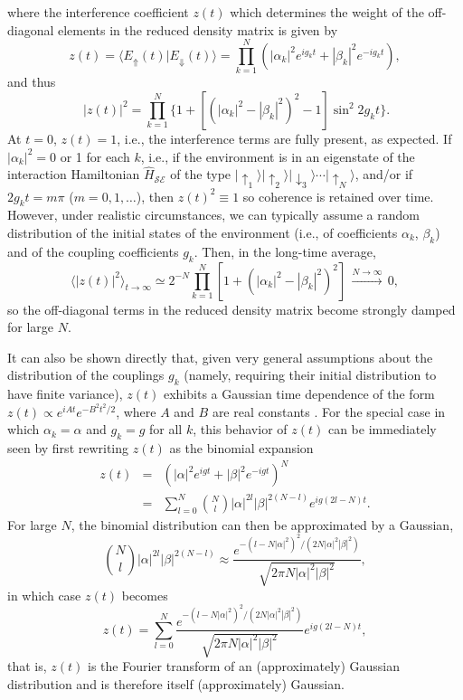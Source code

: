\documentclass[rmp,aps,amsmath,amsfonts,noshowkeys,noshowpacs,12pt]{revtex4}
\newcommand{\ket}[1]{\ensuremath{|{#1\rangle}}}
\begin{document}
%
where the interference coefficient $z(t)$ which determines the weight
of the off-diagonal elements in the reduced density matrix is given by
%
\begin{equation} 
z(t) = \langle E_{\Uparrow}(t) | E_{\Downarrow}(t) \rangle 
=\prod_{k=1}^N (|\alpha_k|^2 e^{ig_kt} + |\beta_k|^2 e^{-ig_kt} ),
\end{equation} 
%
and thus
%
\begin{equation} \
|z(t)|^2 = \prod_{k=1}^N \{ 1 + [(|\alpha_k|^2 - |\beta_k|^2)^2
-1] \sin^2 2g_kt \}. 
\end{equation} 
%
At $t=0$, $z(t)=1$, i.e., the interference terms are fully present, as
expected. If $|\alpha_k|^2=0$ or 1 for each $k$, i.e., if the
environment is in an eigenstate of the interaction Hamiltonian
$\widehat{H}_\mathcal{SE}$ of the type $\ket{\uparrow_1} \ket{\uparrow_2}
\ket{\downarrow_3} \cdots \ket{\uparrow_N}$, and/or if $2g_kt = m\pi$
($m=0,1,\hdots$), then $z(t)^2 \equiv 1$ so coherence is retained over
time.  However, under realistic circumstances, we can typically assume
a random distribution of the initial states of the environment (i.e., of
coefficients $\alpha_k$, $\beta_k$) and of the coupling coefficients
$g_k$. Then, in the long-time average, 
%
\begin{equation}
\langle |z(t)|^2 \rangle_{t \rightarrow \infty} 
\simeq 2^{-N} \prod_{k=1}^N [1 + (|\alpha_k|^2 -
|\beta_k|^2)^2] \, \stackrel{N\rightarrow \infty}{\longrightarrow} \, 0,
\end{equation} 
%
so the off-diagonal terms in the reduced density matrix become
strongly damped for large $N$. 

It can also be shown directly that, given very general assumptions
about the distribution of the couplings $g_k$ (namely, requiring their
initial distribution to have finite variance), $z(t)$ exhibits a
Gaussian time dependence of the form $z(t) \propto e^{iAt}
e^{-B^2t^2/2}$, where $A$ and $B$ are real constants
\citep{Zurek:2003:om}. For the special case in which $\alpha_k=\alpha$
and $g_k=g$ for all $k$, this behavior of $z(t)$ can be immediately
seen by first rewriting $z(t)$ as the binomial expansion
%
\begin{eqnarray} 
z(t) &=& (|\alpha|^2 e^{igt} + |\beta|^2 e^{-igt} )^N \nonumber \\ &=& \sum_{l=0}^N
\binom{N}{l} |\alpha|^{2l} |\beta|^{2(N-l)} e^{ig(2l-N)t}.
\end{eqnarray} 
%
For large $N$, the binomial distribution can then be approximated by a
Gaussian,
%
\begin{equation}
\binom{N}{l} |\alpha|^{2l} |\beta|^{2(N-l)} \approx
\frac{e^{-(l-N|\alpha|^2)^2/(2N|\alpha|^2 |\beta|^2)}}{\sqrt{2\pi N |\alpha|^2 |\beta|^2}},
\end{equation} 
%
in which case $z(t)$ becomes
%
\begin{equation}
z(t) = \sum_{l=0}^N \frac{e^{-(l-N|\alpha|^2)^2/(2N|\alpha|^2
 |\beta|^2)}}{\sqrt{2\pi N |\alpha|^2 |\beta|^2}} 
 e^{ig(2l-N)t}, 
\end{equation} 
%
that is, $z(t)$ is the Fourier transform of an (approximately) Gaussian
distribution and is therefore itself (approximately) Gaussian.
\end{document}
